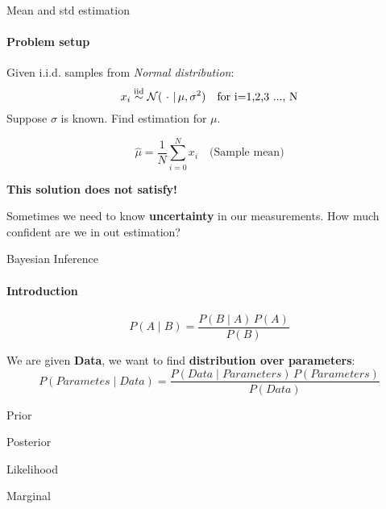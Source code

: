 \begin{frame}{Mean and std estimation}
\framesubtitle{Problem setup}


\begin{problem}
Given i.i.d. samples from \textit{Normal distribution}:
\begin{equation*}
x_i \overset{\text{iid}}{\sim} \mathcal{N}(\,\, \cdot \,\, | \, \mu, \sigma^2) \text{\quad  for i=1,2,3 ..., N}
\end{equation*}
Suppose $\sigma$ is known. Find estimation for $\mu$.
\end{problem}
\pause
\begin{solution}
\begin{equation*}
    \hat{\mu} = \frac{1}{N} \sum_{i=0}^N{x_i} \quad \text{(Sample mean)}
\end{equation*}
\end{solution}
\pause
\textbf{This solution does not satisfy!}

Sometimes we need to know \textbf{uncertainty} in our measurements.
How much confident are we in out estimation?
\end{frame}

\begin{frame}{Bayesian Inference}
\framesubtitle{Introduction}
\begin{theorem}
\begin{equation*}
P(A \mid B) = \frac{P(B \mid A) \, P(A)}{P(B)}
\end{equation*}
\end{theorem}
\pause
\begin{example}
We are given \textbf{Data}, we want to find \textbf{distribution over parameters}:
\begin{equation*}
    P( Parametes \mid Data ) = \frac{P( Data \mid Parameters ) \, P(Parameters)}{P(Data)}
\end{equation*}
\end{example}
\pause
\begin{description}[leftmargin=1cm, labelwidth=3cm]
\item[$P(Parameters)$] Prior
\item[$P( Parametes \mid Data ) $] Posterior
\item[$P( Data \mid Parameters )$] Likelihood
\item[$P(Data)$] Marginal
\end{description}
\end{frame}

